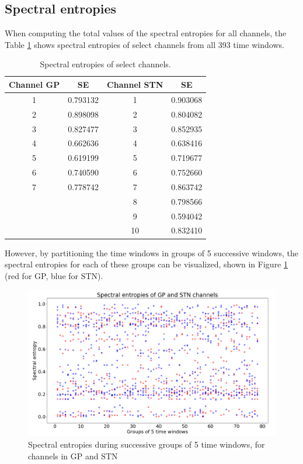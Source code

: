 \documentclass{kththesis}
\begin{document}
\subsection{Spectral entropies}

When computing the total values of the spectral entropies for all channels, the Table \ref{tab:spec_entr} shows spectral entropies of select channels from all 393 time windows.

\begin{table}[H]
    \centering
    \begin{tabular}{|c|c|c|c|}
    \hline
    Channel GP & SE  & Channel STN & SE \\ \hline
    1 & 0.793132 &  1  & 0.903068 \\
    2 & 0.898098 & 2  & 0.804082 \\
    3 & 0.827477 &  3  & 0.852935 \\
    4 & 0.662636 &  4  & 0.638416 \\
    5 & 0.619199 &  5  & 0.719677 \\
    6 & 0.740590 &  6  & 0.752660 \\
    7 & 0.778742 & 7  & 0.863742 \\
    & &             8  & 0.798566 \\
    & &             9  & 0.594042 \\
    & &             10 & 0.832410 \\ \hline
    
   
    \end{tabular}
    \caption{Spectral entropies of select channels.}
    \label{tab:spec_entr}
\end{table}

However, by partitioning the time windows in groups of 5 successive windows, the spectral entropies for each of these groups can be visualized, shown in Figure \ref{fig:SE1} (red for GP, blue for STN).  

\begin{figure}[H]
    \centering
    \centerline{\includegraphics[width=1\textwidth]{images/spiking/spec_entr_5tw.png}}
    \caption{Spectral entropies during successive groups of 5 time windows, for channels in GP and STN}
    \label{fig:SE1}
\end{figure}
\end{document}
